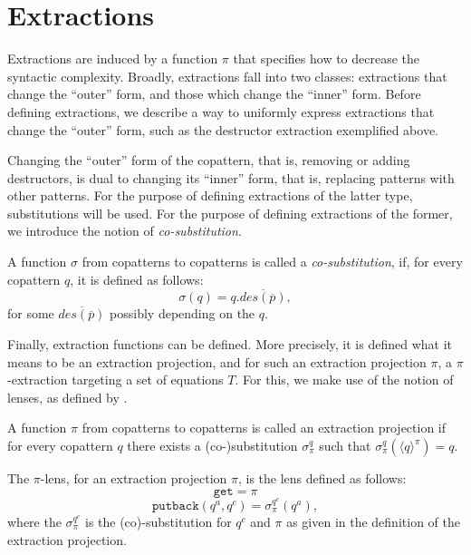 \section{Extractions}
\label{sec:extrdef}

Extractions are induced by a function $\pi$ that specifies how to decrease the syntactic complexity. Broadly, extractions fall into two classes: extractions that change the ``outer'' form, and those which change the ``inner'' form. Before defining extractions, we describe a way to uniformly express extractions that change the ``outer'' form, such as the destructor extraction exemplified above.

Changing the ``outer'' form of the copattern, that is, removing or adding destructors, is dual to changing its ``inner'' form, that is, replacing patterns with other patterns. For the purpose of defining extractions of the latter type, substitutions will be used. For the purpose of defining extractions of the former, we introduce the notion of \textit{co-substitution}.

\begin{definition}[Co-substitution]
A function $\sigma$ from copatterns to copatterns is called a \textit{co-substitution}, if, for every copattern $q$, it is defined as follows:
\[
\sigma(q) = q.\overline{des(\overline{p})},
\]
for some $\overline{des(\overline{p})}$ possibly depending on the $q$.
\end{definition}

Finally, extraction functions can be defined. More precisely, it is defined what it means to be an extraction projection, and for such an extraction projection $\pi$, a $\pi$-extraction targeting a set of equations $T$. For this, we make use of the notion of lenses, as defined by \citet{foster05combinators}.

\begin{definition}
\label{def:extrproj}
A function $\pi$ from copatterns to copatterns is called an extraction projection if for every copattern $q$ there exists a (co-)substitution $\sigma^q_\pi$ such that $\sigma^q_\pi(\langle q \rangle^\pi) = q$.
\end{definition}

\begin{definition}[$\pi$-lens]
The $\pi$-lens, for an extraction projection $\pi$, is the lens defined as follows:
\[
\mathtt{get} = \pi
\]
\[
\mathtt{putback}(q^a, q^c) = \sigma^{q^c}_\pi(q^a),
\]
where the $\sigma^{q^c}_\pi$ is the (co)-substitution for $q^c$ and $\pi$ as given in the definition of the extraction projection.
\end{definition}


